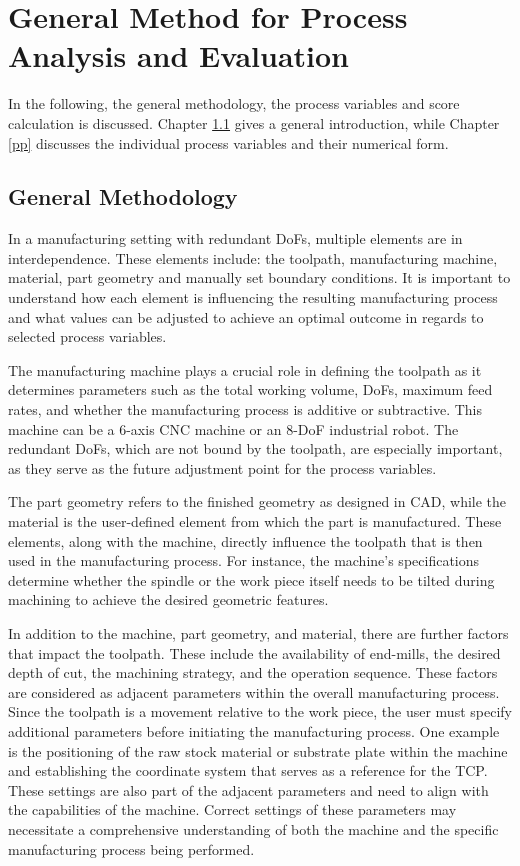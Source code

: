 \section{General Method for Process Analysis and Evaluation}
In the following, the general methodology, the process variables and score calculation is discussed.
Chapter \ref{general} gives a general introduction, while Chapter \ref{pp} discusses the individual process variables and their numerical form.




\subsection{General Methodology}\label{general}
In a manufacturing setting with redundant \acrshort{DoF}s, multiple elements are in interdependence. These elements include: the toolpath, manufacturing machine, material, part geometry and manually set boundary conditions. It is important to understand how each element is influencing the resulting manufacturing process and what values can be adjusted to achieve an optimal outcome in regards to selected process variables.

The manufacturing machine plays a crucial role in defining the toolpath as it determines parameters such as the total working volume, \acrshort{DoF}s, maximum feed rates, and whether the manufacturing process is additive or subtractive. This machine can be a 6-axis \acrshort{CNC} machine or an 8-\acrshort{DoF} industrial robot. The redundant \acrshort{DoF}s, which are not bound by the toolpath, are especially important, as they serve as the future adjustment point for the process variables.

The part geometry refers to the finished geometry as designed in \acrshort{CAD}, while the material is the user-defined element from which the part is manufactured. These elements, along with the machine, directly influence the toolpath that is then used in the manufacturing process. For instance, the machine's specifications determine whether the spindle or the work piece itself needs to be tilted during machining to achieve the desired geometric features.

In addition to the machine, part geometry, and material, there are further factors that impact the toolpath. These include the availability of end-mills, the desired depth of cut, the machining strategy, and the operation sequence. These factors are considered as adjacent parameters within the overall manufacturing process. Since the toolpath is a movement relative to the work piece, the user must specify additional parameters before initiating the manufacturing process. One example is the positioning of the raw stock material or substrate plate within the machine and establishing the coordinate system that serves as a reference for the \acrshort{TCP}. These settings are also part of the adjacent parameters and need to align with the capabilities of the machine. Correct settings of these parameters may necessitate a comprehensive understanding of both the machine and the specific manufacturing process being performed.

